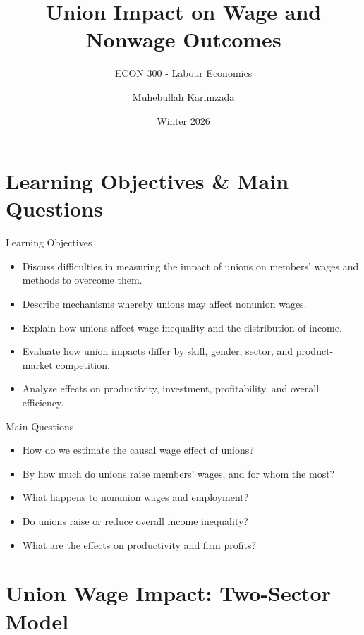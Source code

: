 \documentclass[aspectratio=169]{beamer}
\title{\textbf{Union Impact on Wage and Nonwage Outcomes  \vspace{.5cm}\\  }}
\subtitle{ {\large ECON 300 - Labour Economics}}
\author{Muhebullah Karimzada}
\date{Winter 2026}
\begin{document}
\begin{frame}[plain]
  \titlepage
\end{frame}

\section{Learning Objectives \& Main Questions}

\begin{frame}{Learning Objectives}
\transfade
\begin{itemize}[<+->]
  \item Discuss difficulties in measuring the impact of unions on members' wages and methods to overcome them.
  \item Describe mechanisms whereby unions may affect nonunion wages.
  \item Explain how unions affect wage inequality and the distribution of income.
  \item Evaluate how union impacts differ by skill, gender, sector, and product-market competition.
  \item Analyze effects on productivity, investment, profitability, and overall efficiency.
\end{itemize}
\end{frame}

\begin{frame}{Main Questions}
\transfade
\begin{itemize}[<+->]
  \item How do we estimate the \alert{causal} wage effect of unions?
  \item By how much do unions raise members' wages, and for whom the most?
  \item What happens to nonunion wages and employment?
  \item Do unions raise or reduce overall income inequality?
  \item What are the effects on productivity and firm profits?
\end{itemize}
\end{frame}

\section{Union Wage Impact: Two-Sector Model}
\end{document}
